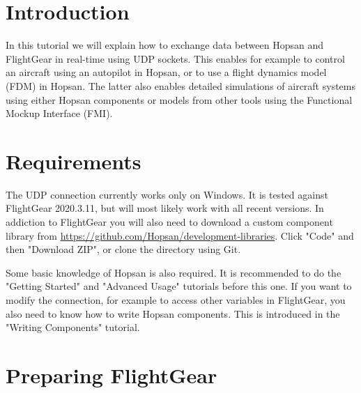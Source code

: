 \documentclass[a4paper]{article}
\begin{document}

\section*{Introduction}
In this tutorial we will explain how to exchange data between Hopsan and FlightGear in real-time using UDP sockets. This enables for example to control an aircraft using an autopilot in Hopsan, or to use a flight dynamics model (FDM) in Hopsan. The latter also enables detailed simulations of aircraft systems using either Hopsan components or models from other tools using the Functional Mockup Interface (FMI).

\section*{Requirements}
The UDP connection currently works only on Windows. It is tested against FlightGear 2020.3.11, but will most likely work with all recent versions. In addiction to FlightGear you will also need to download a custom component library from \url{https://github.com/Hopsan/development-libraries}. Click "Code" and then "Download ZIP", or clone the directory using Git.

Some basic knowledge of Hopsan is also required. It is recommended to do the "Getting Started" and "Advanced Usage" tutorials before this one. If you want to modify the connection, for example to access other variables in FlightGear, you also need to know how to write Hopsan components. This is introduced in the "Writing Components" tutorial.

\section*{Preparing FlightGear}
\end{document}
